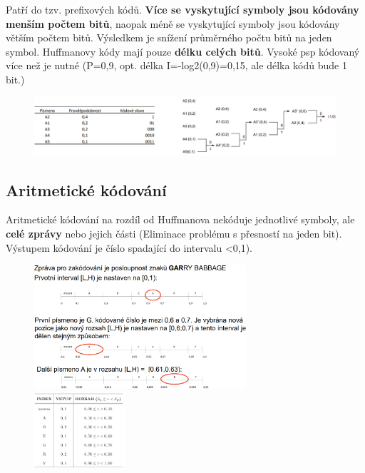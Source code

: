 Patří do tzv. prefixových kódů. \textbf{Více se vyskytující symboly jsou kódovány menším počtem bitů}, naopak méně se vyskytující symboly jsou kódovány větším počtem bitů. Výsledkem je snížení průměrného počtu bitů na jeden symbol. Huffmanovy kódy mají pouze \textbf{délku celých bitů}. Vysoké psp kódovaný více než je nutné (P=0,9, opt. délka I=-log2(0,9)=0,15, ale délka kódů bude 1 bit.)

\begin{figure}[ht]
    \centering
    \includegraphics[width=0.9\linewidth]{MPC-ZMD//images/huff.png}
\end{figure}
\FloatBarrier


\subsection{Aritmetické kódování}

Aritmetické kódování na rozdíl od Huffmanova nekóduje jednotlivé symboly,
ale \textbf{celé zprávy} nebo jejich části (Eliminace problému s přesností na jeden bit). Výstupem kódování je číslo spadající do intervalu <0,1). 

\begin{figure}[ht]
    \includegraphics[width=0.7\textwidth]{MPC-ZMD//images/ar.png}
    \hfill
    \includegraphics[width=0.3\textwidth]{MPC-ZMD//images/hufff.png}
\end{figure}
\FloatBarrier

